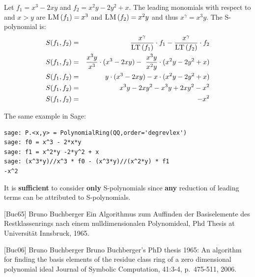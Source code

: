 \documentclass[9pt]{beamer}
\newcommand{\memph}[1]{{\color{yellow9}{\bf #1}}\xspace}
\newcommand{\LM}[1]{\ensuremath{\textsc{LM}\left(#1\right)}\xspace}
\newcommand{\LT}[1]{\ensuremath{\textsc{LT}\left(#1\right)}\xspace}
\begin{document}
\begin{frame}
\begin{example}
 Let $f_1 = x^3 - 2xy$ and $f_2 = x^2y - 2y^2 + x$. The leading monomials with respect to \memph{degrevlex} and $x > y$ are
$\LM{f_1} = x^3$ and $\LM{f_2} = x^2y$ and thus $x^\gamma = x^3y$. The S-polynomial is:
\begin{eqnarray*}
S(f_1,f_2) &=& \dfrac{x^\gamma}{\LT{f_1}} \cdot f_1 - \dfrac{x^\gamma}{\LT{f_2}} \cdot f_2\\
S(f_1,f_2) &=& \dfrac{x^3y}{x^3} \cdot (x^3 - 2xy) -\ \dfrac{x^3y}{x^2y} \cdot (x^2y - 2y^2 + x)\\
S(f_1,f_2) &=& y \cdot (x^3 - 2xy) -  x \cdot (x^2y - 2y^2 + x)\\
S(f_1,f_2) &=& x^3y - 2xy^2 -  x^3y + 2xy^2 - x^2\\
S(f_1,f_2) &=& -x^2
\end{eqnarray*}
\end{example}

\framebreak

The same example in Sage:

\begin{lstlisting}
sage: P.<x,y> = PolynomialRing(QQ,order='degrevlex')
sage: f0 = x^3 - 2*x*y
sage: f1 = x^2*y -2*y^2 + x
sage: (x^3*y)//x^3 * f0 - (x^3*y)//(x^2*y) * f1
-x^2
\end{lstlisting}

\framebreak

\begin{block}{}
It is \textbf{sufficient} to consider \textbf{only} S-polynomials since \textbf{any} reduction of leading terms can be attributed to S-polynomials. 
\end{block}

\vspace{1em}

\begin{thebibliography}{fooobaaa}
[Buc65] Bruno Buchberger
\newblock Ein {A}lgorithmus zum {A}uffinden der {B}asiselemente des {R}estklassenrings nach einem nulldimensionalen {P}olynomideal,
\newblock Phd Thesis at Universität Innsbruck, 1965.

[Buc06] Bruno Buchberger
\newblock Bruno Buchberger's PhD thesis 1965: An algorithm for finding the basis elements of the residue class ring of a zero dimensional polynomial ideal
\newblock Journal of Symbolic Computation, 41:3-4, p.\ 475-511, 2006.

\end{thebibliography}

\end{frame}
\end{document}
